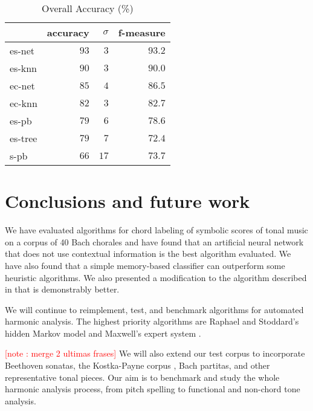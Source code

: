 \documentclass{article}
\newcounter{notecounter}
\newcommand{\note}[1]{
  \addtocounter{notecounter}{1}
  \textcolor{red}{[note \arabic{notecounter}: #1]}
}
\begin{document}
\begin{table}
  \centering
  \begin{tabular}{l|rrr}
       & accuracy& $\sigma$  & f-measure\\
\hline
es-net &$   93  $&$  3$      &$93.2$ \\
es-knn &$   90  $&$  3$      &$90.0$ \\
ec-net &$   85  $&$  4$      &$86.5$ \\
ec-knn &$   82  $&$  3$      &$82.7$ \\
es-pb  &$   79  $&$  6$      &$78.6$ \\
es-tree&$   79  $&$  7$      &$72.4$ \\
s-pb   &$   66  $&$ 17$      &$73.7$ \\

  \end{tabular}                                                        


  \caption{Overall Accuracy (\%)}
  \label{tab:accuracy}
\end{table}

\section{Conclusions and future work}
\label{sec:conclusions}

We have evaluated algorithms for chord labeling of symbolic scores of
tonal music on a corpus of 40 Bach chorales and have found that an
artificial neural network that does not use contextual information is
the best algorithm evaluated. We have also found that a simple
memory-based classifier can outperform some heuristic algorithms. We
also presented a modification to the algorithm described in
\cite{pardo.ea:algorithms} that is demonstrably better.

We will continue to reimplement, test, and benchmark algorithms for
automated harmonic analysis. The highest priority algorithms are
Raphael and Stoddard's hidden Markov model \cite{raphael.ea:harmonic}
and Maxwell's expert system \cite{maxwell:expert}. \note{merge 2
  ultimas frases} We will also extend our test corpus to incorporate
Beethoven sonatas, the Kostka-Payne corpus \cite{temperley:bayesian},
Bach partitas, and other representative tonal pieces. Our aim is to
benchmark and study the whole harmonic analysis process, from pitch
spelling to functional and non-chord tone analysis.



\end{document}
